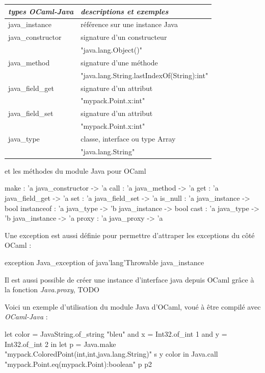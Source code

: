\documentclass[a4paper, 11pt]{article}
\begin{document}
\begin{tabular}{|l|l|}
  \hline
  \emph{types OCaml-Java} & \emph{descriptions et exemples} \\\hline
  java\_instance & référence sur une instance Java  \\
  \hline
  java\_constructor & signature d'un constructeur  \\
  &  "java.lang.Object()" \\
  \hline
  java\_method & signature d'une méthode \\
  & "java.lang.String.lastIndexOf(String):int"\\
  \hline
  java\_field\_get & signature d'un attribut\\
  & "mypack.Point.x:int" \\
  \hline
  java\_field\_set & signature d'un attribut\\
  & "mypack.Point.x:int" \\
  \hline
  java\_type & classe, interface ou type Array\\
  & "java.lang.String"\\
  \hline
\end{tabular}

\noindent
et les méthodes du module Java\cite{module Java} pour OCaml

\begin{OCamlEx}
make : 'a java_constructor -> 'a 
call : 'a java_method -> 'a 
get : 'a java_field_get -> 'a 
set : 'a java_field_set -> 'a 
is_null : 'a java_instance -> bool 
instanceof : 'a java_type -> 'b java_instance -> bool
cast : 'a java_type -> 'b java_instance -> 'a
proxy : 'a java_proxy -> 'a
\end{OCamlEx}
Une exception est aussi définie pour permettre d'attraper les
exceptions du côté OCaml :
\begin{OCamlEx}
exception Java_exception of java'lang'Throwable java_instance
\end{OCamlEx}

Il est aussi possible de créer une instance d'interface java depuis 
OCaml grâce à la fonction \emph{Java.proxy}, 
TODO

Voici un exemple d'utilisation du module Java \cite{module Java} d'OCaml, voué à être compilé avec \emph{OCaml-Java} :
\begin{OCamlEx}
let color = JavaString.of_string "bleu"
and x = Int32.of_int 1
and y = Int32.of_int 2 in
let p = Java.make "mypack.ColoredPoint(int,int,java.lang.String)" s y color 
in
   Java.call "mypack.Point.eq(mypack.Point):boolean" p p2
\end{OCamlEx}
\end{document}
